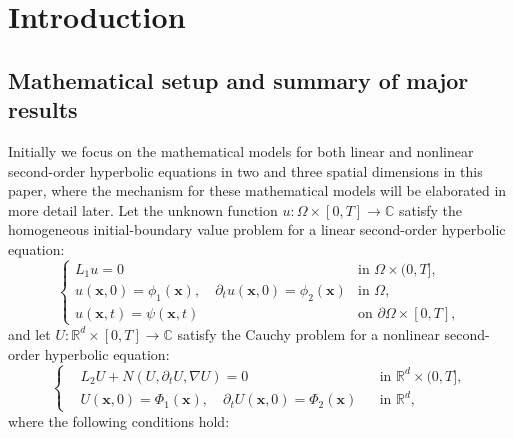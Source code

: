 \documentclass[11pt,reqno,oneside]{amsart}
\numberwithin{equation}{section}
\theoremstyle{definition}
\theoremstyle{remark}
\numberwithin{equation}{section}
\begin{document}
	
	
	\section{Introduction}
	
	\subsection{Mathematical setup and summary of major results}\label{setup}
	
	
	
	
	Initially we focus on the mathematical models for both linear and nonlinear second-order hyperbolic equations in two and three spatial dimensions in this paper, where the mechanism for these mathematical models will be elaborated in more detail later. Let the unknown function $u:\Omega \times [0,T] \rightarrow \mathbb{C}$ satisfy the homogeneous initial-boundary value problem for a linear second-order hyperbolic equation:
	\begin{equation}\label{1.1}
		\begin{cases}
			L_1u = 0 & \text{in } \Omega \times (0,T], \\
			u(\mathbf{x},0) = \phi_1(\mathbf{x}), \quad \partial_t u(\mathbf{x},0) = \phi_2(\mathbf{x}) & \text{in } \Omega, \\
			u(\mathbf{x},t) = \psi(\mathbf{x},t) & \text{on } \partial\Omega \times [0,T],
		\end{cases}
	\end{equation}
	and let $U: \mathbb{R}^d \times [0,T] \rightarrow \mathbb{C}$ satisfy the Cauchy problem for a nonlinear  second-order hyperbolic equation:
	\begin{equation}\label{1.2}
		\left\{
		\begin{aligned}
			&L_2U + N(U,\partial_{t}U,\nabla U) = 0 
			&& \text{in } \mathbb{R}^{d} \times (0,T], \\
			&U(\mathbf{x},0) = \Phi_1(\mathbf{x}), \quad \partial_t U(\mathbf{x},0) = \Phi_2(\mathbf{x}) 
			&& \text{in } \mathbb{R}^d,
		\end{aligned}
		\right.
	\end{equation}
	where the following conditions hold:
\end{document}

